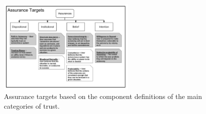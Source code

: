         \begin{figure}[htbp]
            \includegraphics[width=0.6\textwidth]{Figures/Assurances.pdf}%
            \caption{Assurance targets based on the component definitions of the main categories of trust.} %
            \label{fig:Assurance_classes}
        \end{figure}
